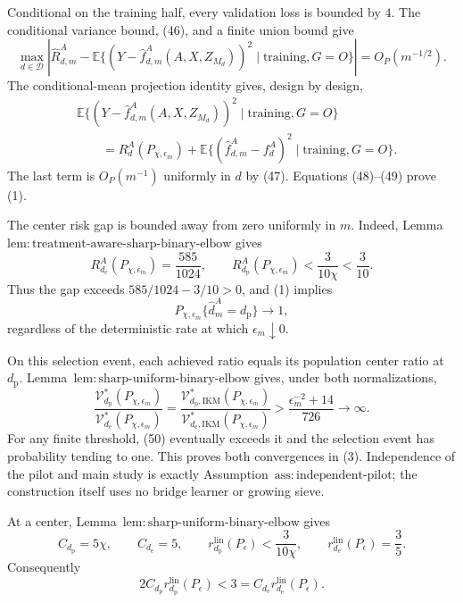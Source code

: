 Conditional on the training half, every validation loss is bounded by \(4\).  The conditional variance bound, (46), and a finite union bound give
\[
 \max_{d\in\mathcal D}\left|
 \widehat R_{d,m}^A-
 \mathbb E\{(Y-\widehat f_{d,m}^A(A,X,Z_{M_d}))^2
 \mid\text{training},G=O\}
 \right|=O_P(m^{-1/2}).                                   \tag{48}
\]
The conditional-mean projection identity gives, design by design,
\[
\begin{aligned}
 &\mathbb E\{(Y-\widehat f_{d,m}^A(A,X,Z_{M_d}))^2
 \mid\text{training},G=O\}\\
 &\qquad=R_d^A(P_{\chi,\epsilon_m})
 +\mathbb E\{(\widehat f_{d,m}^A-f_d^A)^2
 \mid\text{training},G=O\}.
\end{aligned}                                               \tag{49}
\]
The last term is \(O_P(m^{-1})\) uniformly in \(d\) by (47).  Equations (48)--(49) prove (1).

The center risk gap is bounded away from zero uniformly in \(m\).  Indeed, Lemma~\(\mathrm{lem{:}treatment\text{-}aware\text{-}sharp\text{-}binary\text{-}elbow}\) gives
\[
 R_{d_{\mathrm e}}^A(P_{\chi,\epsilon_m})
 =\frac{585}{1024},
 \qquad
 R_{d_{\mathrm p}}^A(P_{\chi,\epsilon_m})
 <\frac3{10\chi}<\frac3{10}.
\]
Thus the gap exceeds \(585/1024-3/10>0\), and (1) implies
\[
 P_{\chi,\epsilon_m}\{\widehat d_m^A=d_{\mathrm p}\}\longrightarrow1,
\]
regardless of the deterministic rate at which \(\epsilon_m\downarrow0\).

On this selection event, each achieved ratio equals its population center ratio at \(d_{\mathrm p}\).  Lemma~\(\mathrm{lem{:}sharp\text{-}uniform\text{-}binary\text{-}elbow}\) gives, under both normalizations,
\[
 \frac{\mathcal V_{d_{\mathrm p}}^*(P_{\chi,\epsilon_m})}
 {\mathcal V_{d_{\mathrm e}}^*(P_{\chi,\epsilon_m})}
 =\frac{\mathcal V_{d_{\mathrm p},\mathrm{IKM}}^*(P_{\chi,\epsilon_m})}
 {\mathcal V_{d_{\mathrm e},\mathrm{IKM}}^*(P_{\chi,\epsilon_m})}
 >\frac{\epsilon_m^{-2}+14}{726}\longrightarrow\infty.  \tag{50}
\]
For any finite threshold, (50) eventually exceeds it and the selection event has probability tending to one.  This proves both convergences in (3).  Independence of the pilot and main study is exactly Assumption~\(\mathrm{ass{:}independent\text{-}pilot}\); the construction itself uses no bridge learner or growing sieve.

At a center, Lemma~\(\mathrm{lem{:}sharp\text{-}uniform\text{-}binary\text{-}elbow}\) gives
\[
 C_{d_{\mathrm p}}=5\chi,
 \qquad C_{d_{\mathrm e}}=5,
 \qquad
 r_{d_{\mathrm p}}^{\mathrm{lin}}(P_\epsilon)<\frac3{10\chi},
 \qquad
 r_{d_{\mathrm e}}^{\mathrm{lin}}(P_\epsilon)=\frac35.
\]
Consequently
\[
 2C_{d_{\mathrm p}}r_{d_{\mathrm p}}^{\mathrm{lin}}(P_\epsilon)
 <3=C_{d_{\mathrm e}}r_{d_{\mathrm e}}^{\mathrm{lin}}(P_\epsilon). \tag{51}
\]


